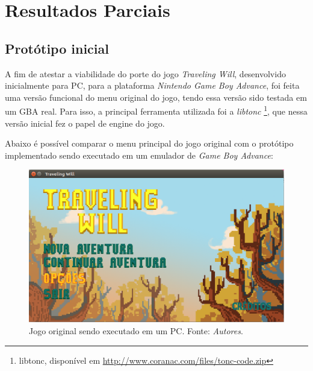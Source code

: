 \chapter[Resultados Parciais]{Resultados Parciais}

\section{Protótipo inicial}

A fim de atestar a viabilidade do porte do jogo \textit{Traveling Will}, desenvolvido inicialmente para PC, para a plataforma \textit{Nintendo Game Boy Advance}, foi feita uma versão funcional do menu original do jogo, tendo essa versão sido testada em um GBA real. Para isso, a principal ferramenta utilizada foi a \textit{libtonc} \footnote{libtonc, disponível em \url{http://www.coranac.com/files/tonc-code.zip}}, que nessa versão inicial fez o papel de engine do jogo.

Abaixo é possível comparar o menu principal do jogo original com o protótipo implementado sendo executado em um emulador de \textit{Game Boy Advance}:

\begin{figure}[H]
 \centering \includegraphics[keepaspectratio=true,scale=0.6]{figuras/tw-original-1.eps}
   \caption[Jogo original sendo executado em um PC]
    {Jogo original sendo executado em um PC. Fonte: \textit{Autores}.}
   \label{tw-original-1}
\end{figure}

